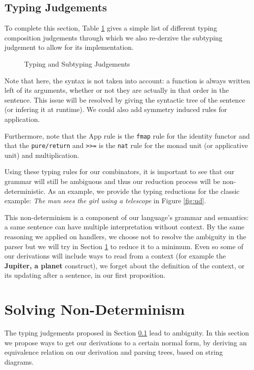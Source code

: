 \documentclass[math, english, info]{cours}
\begin{document}
\subsection{Typing Judgements}\label{subsec:judgements}
To complete this section, Table \ref{fig:judgements} gives a simple list of different typing composition judgements through which we also re-derzive the subtyping judgement to allow for its implementation.
\begin{figure}
	\caption{Typing and Subtyping Judgements}
	\label{fig:judgements}
\end{figure}
Note that here, the syntax is not taken into account: a function is always written left of its arguments, whether or not they are actually in that order in the sentence.
This issue will be resolved by giving the syntactic tree of the sentence (or infering it at runtime).
We could also add symmetry induced rules for application.

Furthermore, note that the App rule is the \texttt{fmap} rule for the identity functor and that the \texttt{pure/return} and \texttt{>>=} is the \texttt{nat} rule for the monad unit (or applicative unit) and multiplication.

\medskip

Using these typing rules for our combinators, it is important to see that our grammar will still be ambiguous and thus our reduction process will be non-deterministic.
As an example, we provide the typing reductions for the classic example: \textsl{The man sees the girl using a telescope} in Figure \ref{fig:ud}.

\begin{figure*}
	\centering
	\caption{Parsing trees for the typing of \textsl{The man sees the girl using a telescope}.}
	\label{fig:ud}
\end{figure*}

This non-determinism is a component of our language's grammar and semantics: a same sentence can have multiple interpretation without context.
By the same reasoning we applied on handlers, we choose not to resolve the ambiguity in the parser but we will try in Section \ref{sec:nondet} to reduce it to a minimum.
Even so some of our derivations will include ways to read from a context (for example the \textbf{Jupiter, a planet} construct), we forget about the definition of the context, or its updating after a sentence, in our first proposition.

\section{Solving Non-Determinism}\label{sec:nondet}
The typing judgements proposed in Section \ref{subsec:judgements} lead to ambiguity.
In this section we propose ways to get our derivations to a certain normal form, by deriving an equivalence relation on our derivation and parsing trees, based on string diagrams.
\end{document}
